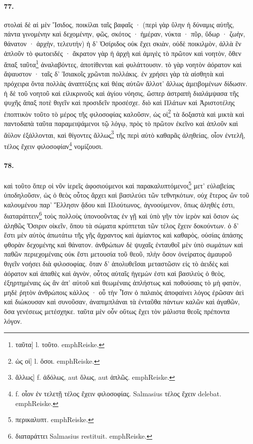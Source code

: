 \documentclass[a4paper, 11pt, oneside, polutonikogreek, german]{article}
\begin{document}
\paragraph{77.}
στολαὶ δὲ αἱ μὲν Ἴσιδος, ποικίλαι ταῖς βαφαῖς · (περὶ γὰρ ὕλην ἡ δύναμις αὐτῆς, πάντα γινομένην καὶ δεχομένην, φῶς, σκότος · ἡμέραν, νύκτα · πῦρ, ὕδωρ · ζωὴν, θάνατον · ἀρχὴν, τελευτήν) ἡ δ' Ὀσίριδος οὐκ ἔχει σκιὰν, οὐδὲ ποικιλμὸν, ἀλλὰ ἓν ἁπλοῦν τὸ φωτοειδές · ἄκρατον γὰρ ἡ ἀρχὴ καὶ ἀμιγὲς τὸ πρῶτον καὶ νοητὸν, ὅθεν ἅπαξ ταῦτα\footnote{ταῦτα] l. τοῦτο. emph{Reiske.}} ἀναλαβόντες, ἀποτίθενται καὶ φυλάττουσιν. τὸ γὰρ νοητὸν ἀόρατον καὶ ἄψαυστον · ταῖς δ' Ἰσιακοῖς χρῶνται πολλάκις. ἐν χρήσει γὰρ τὰ αἰσθητὰ καὶ πρόχειρα ὄντα πολλὰς ἀναπτύξεις καὶ θέας αὑτῶν ἄλλοτ' ἄλλως ἀμειβομένων δίδωσιν. ἡ δὲ τοῦ νοητοῦ καὶ εἰλικρινοῦς καὶ ἁγίου νόησις, ὥσπερ ἀστραπὴ διαλάμψασα τῆς ψυχῆς ἅπαξ ποτὲ θιγεῖν καὶ προσιδεῖν προσέσχε. διὸ καὶ Πλάτων καὶ Ἀριστοτέλης ἐποπτικὸν τοῦτο τὸ μέρος τῆς φιλοσοφίας καλοῦσιν, ὡς οἱ\footnote{ὡς οἱ] l. ὅσοι. emph{Reiske.}} τὰ δοξαστὰ καὶ μικτὰ καὶ παντοδαπὰ ταῦτα παραμειψάμενοι τῷ λόγῳ, πρὸς τὸ πρῶτον ἐκεῖνο καὶ ἁπλοῦν καὶ ἄϋλον ἐξάλλονται, καὶ θίγοντες ἄλλως\footnote{ἄλλως] f. ἀδόλως, aut ὅλως, aut ἁπλῶς. emph{Reiske.} } τῆς περὶ αὐτὸ καθαρᾶς ἀληθείας, οἷον ἐντελῆ, τέλος ἔχειν φιλοσοφίαν\footnote{f. οἷον ἐν τελετῇ τέλος ἔχειν φιλοσοφίας. Salmasius τέλος ἔχειν delebat. emph{Reiske.}} νομίζουσι.

\paragraph{78.}
καὶ τοῦτο ὅπερ οἱ νῦν ἱερεῖς ἀφοσιούμενοι καὶ παρακαλυπτόμενοι\footnote{περικαλυπτ. emph{Reiske.}} μετ' εὐλαβείας ὑποδηλοῦσιν, ὡς ὁ θεὸς οὗτος ἄρχει καὶ βασιλεύει τῶν τεθνηκότων, οὐχ ἕτερος ὢν τοῦ καλουμένου παρ' Ἕλλησιν ᾅδου καὶ Πλούτωνος, ἀγνοούμενον, ὅπως ἀληθές ἐστι, διαταράττειν\footnote{διαταράττει Salmasius restituit. emph{Reiske.}} τοὺς πολλοὺς ὑπονοοῦντας ἐν γῇ καὶ ὑπὸ γῆν τὸν ἱερὸν καὶ ὅσιον ὡς ἀληθῶς Ὄσιριν οἰκεῖν, ὅπου τὰ σώματα κρύπτεται τῶν τέλος ἔχειν δοκούντων. ὁ δ' ἔστι μὲν αὐτὸς ἀπωτάτω τῆς γῆς ἄχραντος καὶ ἀμίαντος καὶ καθαρὸς, οὐσίας ἁπάσης φθορὰν δεχομένης καὶ θάνατον. ἀνθρώπων δὲ ψυχαῖς ἐνταυθοῖ μὲν ὑπὸ σωμάτων καὶ παθῶν περιεχομέναις οὐκ ἔστι μετουσία τοῦ θεοῦ, πλὴν ὅσον ὀνείρατος ἀμαυροῦ θιγεῖν νοήσει διὰ φιλοσοφίας. ὅταν δ' ἀπολυθεῖσαι μεταστῶσιν εἰς τὸ ἀειδὲς καὶ ἀόρατον καὶ ἀπαθὲς καὶ ἁγνὸν, οὗτος αὐταῖς ἡγεμών ἐστι καὶ βασιλεὺς ὁ θεὸς, ἐξηρτημέναις ὡς ἂν ἀπ' αὐτοῦ καὶ θεωμέναις ἀπλήστως καὶ ποθούσαις τὸ μὴ φατὸν, μηδὲ ῥητὸν ἀνθρώποις κάλλος · οὗ τὴν Ἶσιν ὁ παλαιὸς ἀποφαίνει λόγος ἐρῶσαν ἀεὶ καὶ διώκουσαν καὶ συνοῦσαν, ἀναπιμπλάναι τὰ ἐνταῦθα πάντων καλῶν καὶ ἀγαθῶν, ὅσα γενέσεως μετέσχηκε. ταῦτα μὲν οὖν οὕτως ἔχει τὸν μάλιστα θεοῖς πρέποντα λόγον.
\end{document}
